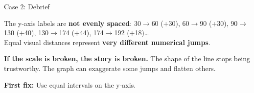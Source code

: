 \documentclass[9pt,english,aspectratio=169]{beamer}
\begin{document}
\begin{frame}{Case 2: Debrief}

  \begin{answerbox}
    The y-axis labels are \textbf{not evenly spaced}: 30$\rightarrow$60 (+30), 60$\rightarrow$90 (+30), 90$\rightarrow$130 (+40), 130$\rightarrow$174 (+44), 174$\rightarrow$192 (+18)\ldots\\[0.3em]
    Equal visual distances represent \textbf{very different numerical jumps}.
  \end{answerbox}

  \vspace{0.5em}
  \begin{insightbox}
    \textbf{If the scale is broken, the story is broken.} The shape of the line stops being trustworthy. The graph can exaggerate some jumps and flatten others.
  \end{insightbox}

  \vspace{0.5em}
  \textbf{First fix:} Use equal intervals on the y-axis.

\end{frame}

\end{document}
